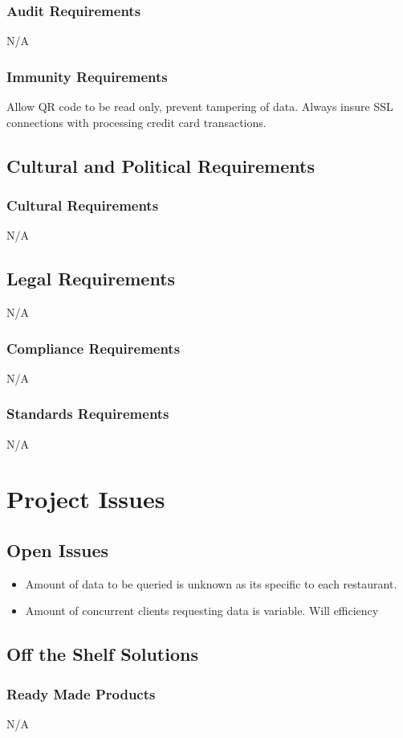 \documentclass[12pt, titlepage]{article}
\begin{document}
\subsubsection{Audit Requirements}
N/A
\subsubsection{Immunity Requirements}
Allow QR code to be read only, prevent tampering of data. 	Always insure SSL connections with processing credit card transactions.
\subsection{Cultural and Political Requirements}
\subsubsection{Cultural Requirements}
N/A
\subsection{Legal Requirements}
N/A
\subsubsection{Compliance Requirements}
N/A
\subsubsection{Standards Requirements}
N/A

\section{Project Issues}
\subsection{Open Issues}
\begin{itemize}
\item Amount of data to be queried is unknown as its specific to each restaurant.
\item Amount of concurrent clients requesting data is variable. Will efficiency
\end{itemize}
\subsection{Off the Shelf Solutions}
\subsubsection{Ready Made Products}
N/A
\end{document}
